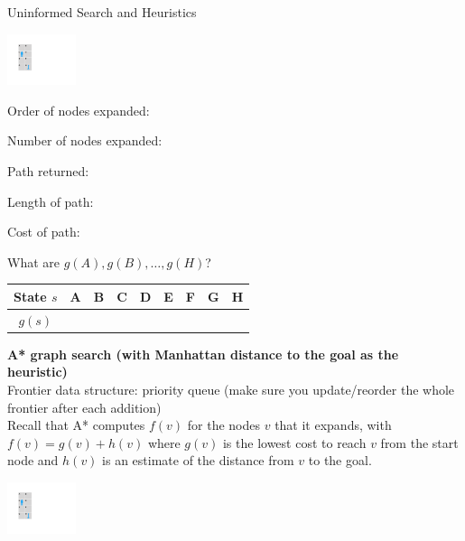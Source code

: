 \begin{problem}{Uninformed Search and Heuristics}
\begin{question}
\begin{subquestion}[8]
\begin{center}
\includegraphics[width=0.15\textwidth]{figures/simple_nodir.pdf}
\label{fig:montezuma}
\end{center}



Order of nodes expanded:

Number of nodes expanded: 

Path returned: 

Length of path: 

Cost of path: 

What are $g(A), g(B), \ldots, g(H)$?

\def\arraystretch{1.5}
\setlength\tabcolsep{15pt}
\begin{center}
\begin{tabular}{|c|c|c|c|c|c|c|c|c|}
    \hline
      State $s$ & A & B & C & D & E & F & G & H  \\
    \hline
      $g(s)$ &  &  &  &  &  &  &  &  \\
    \hline
\end{tabular}
\end{center}

\end{subquestion}

\newpage
\begin{subquestion}[8]
\textbf{A* graph search (with Manhattan distance to the goal as the heuristic)}\\
Frontier data structure: priority queue (make sure you update/reorder the whole frontier after each addition)\\
Recall that A* computes $f(v)$ for the nodes $v$ that it expands, with $f(v) = g(v) + h(v)$ where $g(v)$ is the lowest cost to reach $v$ from the start node and $h(v)$ is an estimate of the distance from $v$ to the goal.\\

\begin{center}
\includegraphics[width=0.15\textwidth]{figures/simple_nodir.pdf}
\label{fig:montezuma}
\end{center}




\end{subquestion}
\end{question}
\end{problem}
